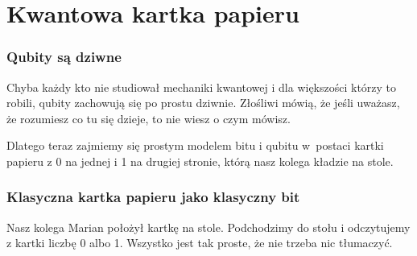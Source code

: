 \documentclass[10pt,t]{beamer}
\begin{document}
\section{Kwantowa kartka papieru}





\begin{frame}
  \frametitle{Qubity są dziwne}


  Chyba każdy kto nie studiował mechaniki kwantowej i dla większości którzy to robili, qubity zachowują się po prostu dziwnie. Złośliwi mówią, że jeśli uważasz, że rozumiesz co tu się dzieje, to nie wiesz o czym mówisz.

  Dlatego teraz zajmiemy się prostym modelem bitu i qubitu w~postaci kartki papieru z 0 na jednej i 1 na drugiej stronie, którą nasz kolega kładzie na stole.

\end{frame}





\begin{frame}
  \frametitle{Klasyczna kartka papieru jako klasyczny bit}


  Nasz kolega Marian położył kartkę na stole. Podchodzimy do stołu i odczytujemy z kartki liczbę 0 albo 1. Wszystko jest tak proste, że nie trzeba nic tłumaczyć.



\end{frame}
\end{document}
